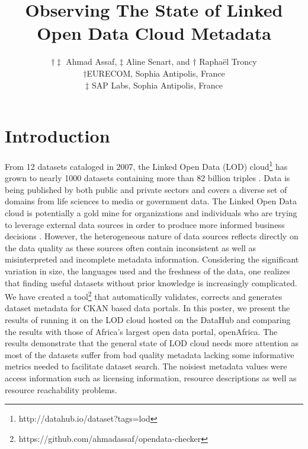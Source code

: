 \documentclass{sig-alternate}
\begin{document}


\title{Observing The State of Linked Open Data Cloud Metadata}

\author{\alignauthor $\dagger\ddagger$ Ahmad Assaf, $\ddagger$ Aline Senart, and $\dagger$ Rapha\"{e}l Troncy \\
\affaddr$\dagger${EURECOM, Sophia Antipolis, France} \\ \affaddr$\ddagger${ SAP Labs, Sophia Antipolis, France} \\
}

\maketitle


\section{Introduction}
From 12 datasets cataloged in 2007, the Linked Open Data (LOD) cloud\footnote{http://datahub.io/dataset?tags=lod} has grown to nearly 1000 datasets containing more than 82 billion triples \cite{BizerHeath2009}. Data is being published by both public and private sectors and covers a diverse set of domains from life sciences to media or government data. The Linked Open Data cloud is potentially a gold mine for organizations and individuals who are trying to leverage external data sources in order to produce more informed business decisions \cite{Boyd2011}. However, the heterogeneous nature of data sources reflects directly on the data quality as these sources often contain inconsistent as well as misinterpreted and incomplete metadata information. Considering the significant variation in size, the languages used and the freshness of the data, one realizes that finding useful datasets without prior knowledge is increasingly complicated.\\

We have created a tool\footnote{https://github.com/ahmadassaf/opendata-checker} that automatically validates, corrects and generates dataset metadata for CKAN based data portals. In this poster, we present the results of running it on the LOD cloud hosted on the DataHub and comparing the results with those of Africa's largest open data portal, openAfrica. The results demonstrate that the general state of LOD cloud needs more attention as most of the datasets suffer from bad quality metadata lacking some informative metrics needed to facilitate dataset search. The noisiest metadata values were access information such as licensing information, resource descriptions as well as resource reachability problems.
\end{document}
